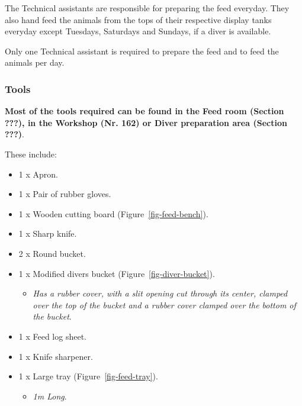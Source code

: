 \documentclass[
  letterpaper,
  DIV=11,
  numbers=noendperiod]{scrreprt}
\providecommand{\tightlist}{%
  \setlength{\itemsep}{0pt}\setlength{\parskip}{0pt}}\usepackage{longtable,booktabs,array}
\begin{document}
The Technical assistants are responsible for preparing the feed
everyday. They also hand feed the animals from the tops of their
respective display tanks everyday except Tuesdays, Saturdays and
Sundays, if a diver is available.

{Only one Technical assistant is required to prepare the feed and to
feed the animals per day}.

\hypertarget{tools}{%
\subsubsection{Tools}\label{tools}}

\textbf{Most of the tools required can be found in the Feed room
(Section ???), in the Workshop (Nr. 162) or Diver preparation area
(Section ???)}.

These include:

\begin{itemize}
\tightlist
\item
  1 x Apron.
\item
  1 x Pair of rubber gloves.
\item
  1 x Wooden cutting board (Figure~\ref{fig-feed-bench}).
\item
  1 x Sharp knife.
\item
  2 x Round bucket.
\item
  1 x Modified divers bucket (Figure~\ref{fig-diver-bucket}).

  \begin{itemize}
  \tightlist
  \item
    \emph{Has a rubber cover, with a slit opening cut through its
    center, clamped over the top of the bucket and a rubber cover
    clamped over the bottom of the bucket}.
  \end{itemize}
\item
  1 x Feed log sheet.
\item
  1 x Knife sharpener.
\item
  1 x Large tray (Figure~\ref{fig-feed-tray}).

  \begin{itemize}
  \tightlist
  \item
    \emph{1m Long}.
  \end{itemize}
\end{itemize}
\end{document}
